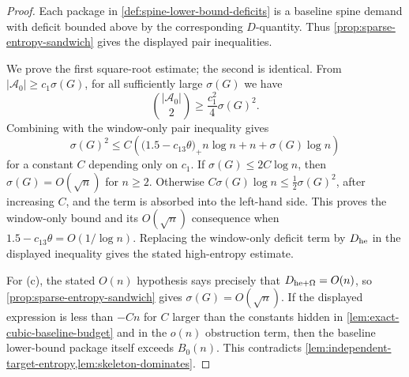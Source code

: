 \documentclass[11pt]{article}
\begin{document}
\begin{proof}
Each package in \cref{def:spine-lower-bound-deficits} is a baseline spine
demand with deficit bounded above by the corresponding \(D\)-quantity.  Thus
\cref{prop:sparse-entropy-sandwich} gives the displayed pair inequalities.

We prove the first square-root estimate; the second is identical.  From
\(|\mathcal A_0|\ge c_1\sigma(G)\), for all sufficiently large \(\sigma(G)\)
we have
\[
\binom{|\mathcal A_0|}{2}\ge \frac{c_1^2}{4}\sigma(G)^2.
\]
Combining with the window-only pair inequality gives
\[
\sigma(G)^2
\le
C\left(
\bigl(1.5-c_{13}\theta\bigr)_+n\log n+n+\sigma(G)\log n
\right)
\]
for a constant \(C\) depending only on \(c_1\).  If
\(\sigma(G)\le2C\log n\), then \(\sigma(G)=O(\sqrt n)\) for \(n\ge2\).  Otherwise
\(C\sigma(G)\log n\le\frac12\sigma(G)^2\), after increasing \(C\), and the
term is absorbed into the left-hand side.  This proves the window-only bound
and its \(O(\sqrt n)\) consequence when
\(1.5-c_{13}\theta=O(1/\log n)\).  Replacing the window-only deficit term by
\(D_{\rm he}\) in the displayed inequality gives the stated high-entropy
estimate.

For (c), the stated \(O(n)\) hypothesis says precisely that
\(D_{\rm he+\Omega}=O(n)\), so
\cref{prop:sparse-entropy-sandwich} gives \(\sigma(G)=O(\sqrt n)\).  If the
displayed expression is less than \(-Cn\) for \(C\) larger than the constants
hidden in \cref{lem:exact-cubic-baseline-budget} and in the \(o(n)\) obstruction
term, then the baseline lower-bound package itself exceeds \(B_0(n)\).  This
contradicts \cref{lem:independent-target-entropy,lem:skeleton-dominates}.
\end{proof}
\end{document}
